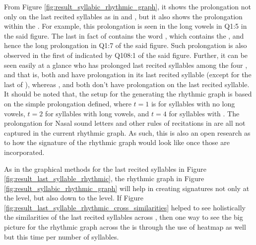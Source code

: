 From Figure \ref{fig:result_syllabic_rhythmic_graph}, it shows the prolongation not only on the last recited syllables as in   and  , but it also shows the prolongation within the  . For example, this prolongation is seen in the long vowels in Q1:5 in the said figure. The last   in fact of   contains the word  , which contains the  , and hence the long prolongation in Q1:7 of the said figure. Such prolongation is also observed in the first   of  indicated by Q108:1 of the said figure. Further, it can be seen easily at a glance who has prolonged last recited syllables among the four  , and that is, both   and   have prolongation in its last recited syllable (except for the last   of  ), whereas  , and   both don't have prolongation on the last recited syllable. It should be noted that, the setup for the generating the rhythmic graph is based on the simple prolongation defined, where $t=1$ is for syllables with no long vowels, $t=2$ for syllables with long vowels, and $t=4$ for syllables with  . The prolongation for Nasal sound letters and other rules of recitations in   are all not captured in the current rhythmic graph. As such, this is also an open research as to how the signature of the rhythmic graph would look like once those are incorporated.

As in the graphical methods for the last recited syllables in Figure \ref{fig:result_last_syllable_rhythmic}, the rhythmic graph in Figure \ref{fig:result_syllabic_rhythmic_graph} will help in creating signatures not only at the   level, but also down to the   level. If Figure \ref{fig:result_last_syllable_rhythmic_cross_similarities} helped to see holistically the similarities of the last recited syllables across  , then one way to see the big picture for the rhythmic graph across the   is through the use of heatmap as well but this time per number of syllables.

